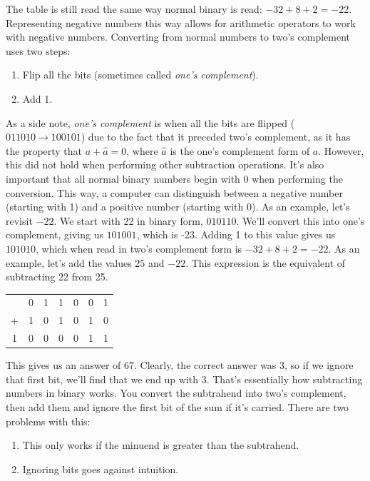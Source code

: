 \documentclass[oneside]{book}
\begin{document}
\tab
The table is still read the same way normal binary is read: $-32 + 8 + 2 = -22$. Representing negative numbers this way allows for arithmetic operators to work with negative numbers.
\newline
\tab
Converting from normal numbers to two's complement uses two steps:
\begin{enumerate}
\item Flip all the bits (sometimes called \textit{one's complement}).
\item Add 1.
\end{enumerate}
\tab
As a side note, \textit{one's complement} is when all the bits are flipped ($011010\rightarrow100101$) due to the fact that it preceded two's complement, as it has the property that $a+\hat{a}=0$, where $\hat{a}$ is the one's complement form of $a$. However, this did not hold when performing other subtraction operations. It's also important that all normal binary numbers begin with 0 when performing the conversion. This way, a computer can distinguish between a negative number (starting with 1) and a positive number (starting with 0). As an example, let's revisit $-22$. We start with 22 in binary form, $010110$. We'll convert this into one's complement, giving us $101001$, which is -23. Adding 1 to this value gives us $101010$, which when read in two's complement form is $-32+8+2=-22$.
\newline
\tab
As an example, let's add the values $25$ and $-22$. This expression is the equivalent of subtracting 22 from 25.
\begin{center}
\begin{tabular}{c c c c c c c}
& 0 & 1 & 1 & 0 & 0 & 1 \\
+ & 1 & 0 & 1 & 0 & 1 & 0 \\
\hline
1 & 0 & 0 & 0 &  0 & 1 & 1
\end{tabular}
\end{center}
\tab
This gives us an answer of $67$. Clearly, the correct answer was $3$, so if we ignore that first bit, we'll find that we end up with 3. That's essentially how subtracting numbers in binary works. You convert the subtrahend into two's complement, then add them and ignore the first bit of the sum if it's carried. There are two problems with this:
\begin{enumerate}
	\item This only works if the minuend is greater than the subtrahend.
	\item Ignoring bits goes against intuition.
\end{enumerate}
\end{document}
